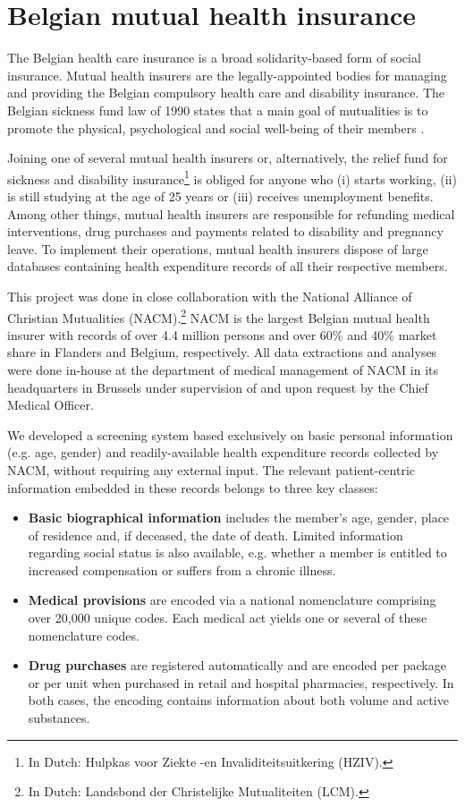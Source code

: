 \section{Belgian mutual health insurance} \label{intro:health-insurance}
The Belgian health care insurance is a broad solidarity-based form of social insurance. Mutual health insurers are the legally-appointed bodies for managing and providing the Belgian compulsory health care and disability insurance. The Belgian sickness fund law of 1990 states that a main goal of mutualities is to promote the physical, psychological and social well-being of their members \citep{ziekenfondswet}.

Joining one of several mutual health insurers or, alternatively, the relief fund for sickness and disability insurance\footnote{In Dutch: Hulpkas voor Ziekte -en Invaliditeitsuitkering (HZIV).} is obliged for anyone who (i) starts working, (ii) is still studying at the age of 25 years or (iii) receives unemployment benefits. Among other things, mutual health insurers are responsible for refunding medical interventions, drug purchases and payments related to disability and pregnancy leave. To implement their operations, mutual health insurers dispose of large databases containing health expenditure records of all their respective members. 

This project was done in close collaboration with the National Alliance of Christian Mutualities (NACM).\footnote{In Dutch: Landsbond der Christelijke Mutualiteiten (LCM).} NACM  is the largest Belgian mutual health insurer with records of over 4.4 million persons and over 60\% and 40\% market share in Flanders and Belgium, respectively. All data extractions and analyses were done in-house at the department of medical management of NACM in its headquarters in Brussels under supervision of and upon request by the Chief Medical Officer.

We developed a screening system based exclusively on basic personal information (e.g. age, gender) and readily-available health expenditure records collected by NACM, without requiring any external input. The relevant patient-centric information embedded in these records belongs to three key classes:
\begin{itemize}
\item \textbf{Basic biographical information} includes the member's age, gender, place of residence and, if deceased, the date of death. Limited information regarding social status is also available, e.g. whether a member is entitled to increased compensation or suffers from a chronic illness.
\item \textbf{Medical provisions} are encoded via a national nomenclature comprising over 20,000 unique codes. Each medical act yields one or several of these nomenclature codes. 
\item \textbf{Drug purchases} are registered automatically and are encoded per package or per unit when purchased in retail and hospital pharmacies, respectively. In both cases, the encoding contains information about both volume and active substances. 
\end{itemize}

